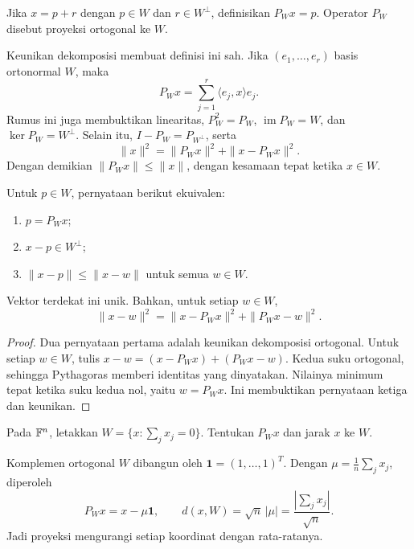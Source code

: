 \begin{definisi}
    Jika $x=p+r$ dengan $p\in W$ dan $r\in W^\perp$,
    definisikan $P_Wx=p$.
    Operator $P_W$ disebut proyeksi ortogonal ke $W$.
\end{definisi}

Keunikan dekomposisi membuat definisi ini sah. Jika $(e_1,\ldots,e_r)$
basis ortonormal $W$, maka
\[
    P_Wx=\sum_{j=1}^r\langle e_j,x\rangle e_j.
\]
Rumus ini juga membuktikan linearitas, $P_W^2=P_W$,
$\operatorname{im}P_W=W$, dan $\ker P_W=W^\perp$.
Selain itu, $I-P_W=P_{W^\perp}$, serta
\[
    \|x\|^2=\|P_Wx\|^2+\|x-P_Wx\|^2.
\]
Dengan demikian $\|P_Wx\|\le\|x\|$, dengan kesamaan tepat ketika $x\in W$.

\begin{teorema}
    Untuk $p\in W$, pernyataan berikut ekuivalen:
    \begin{enumerate}[label=(\roman*),nosep]
        \item $p=P_Wx$;
        \item $x-p\in W^\perp$;
        \item $\|x-p\|\le\|x-w\|$ untuk semua $w\in W$.
    \end{enumerate}
    Vektor terdekat ini unik. Bahkan, untuk setiap $w\in W$,
    \[
        \|x-w\|^2=\|x-P_Wx\|^2+\|P_Wx-w\|^2.
    \]
\end{teorema}
\begin{proof}
    Dua pernyataan pertama adalah keunikan dekomposisi ortogonal.
    Untuk setiap $w\in W$, tulis $x-w=(x-P_Wx)+(P_Wx-w)$.
    Kedua suku ortogonal, sehingga Pythagoras memberi identitas
    yang dinyatakan. Nilainya minimum tepat ketika suku kedua
    nol, yaitu $w=P_Wx$. Ini membuktikan pernyataan ketiga dan keunikan.
\end{proof}

\begin{exam}
    Pada $\mathbb{F}^n$, letakkan $W=\{x:\sum_jx_j=0\}$.
    Tentukan $P_Wx$ dan jarak $x$ ke $W$.
\end{exam}
\begin{solution}
    Komplemen ortogonal $W$ dibangun oleh $\boldsymbol{1}=(1,\ldots,1)^T$.
    Dengan $\mu=\frac1n\sum_jx_j$, diperoleh
    \[
        P_Wx=x-\mu\boldsymbol{1},\qquad
        d(x,W)=\sqrt n\,|\mu|
          =\frac{|\sum_jx_j|}{\sqrt n}.
    \]
    Jadi proyeksi mengurangi setiap koordinat dengan rata-ratanya.
\end{solution}

